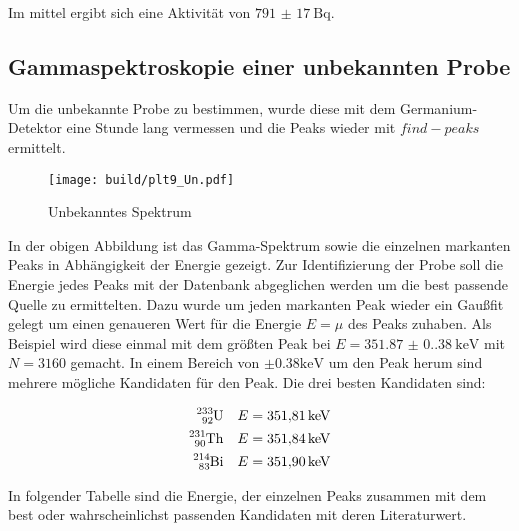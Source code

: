 Im mittel ergibt sich eine Aktivität von $\qty{791(17)}{\becquerel}$.

\subsection{Gammaspektroskopie einer unbekannten Probe}
Um die unbekannte Probe zu bestimmen, wurde diese mit dem Germanium-Detektor
eine Stunde lang vermessen und die Peaks wieder mit $find-peaks$ ermittelt.

\begin{figure}[H]
	\centering
	\texttt{[image: build/plt9\_Un.pdf]}
	\caption{Unbekanntes Spektrum}
	\label{fig:Un_spektrum}
\end{figure}

In der obigen Abbildung ist das Gamma-Spektrum sowie die einzelnen markanten Peaks in
Abhängigkeit der Energie gezeigt. Zur Identifizierung der Probe soll die
Energie jedes Peaks mit der Datenbank \cite{web:nuclear} abgeglichen werden um die
best passende Quelle zu ermittelten. Dazu wurde um jeden markanten Peak wieder ein
Gaußfit gelegt um einen genaueren Wert für die Energie $E=\mu$ des Peaks
zuhaben. Als Beispiel wird diese einmal mit dem größten Peak bei
$E=\qty{351.87(0.38)}{\kilo\eV}$ mit $N=3160$ gemacht. In einem Bereich von
$\pm 0.38\unit{\kilo\eV}$ um den Peak herum sind mehrere mögliche Kandidaten
für den Peak. Die drei besten Kandidaten sind:

\begin{align*}
	\ce{^{233}_{92}U}  &  & E=\qty{351.81}{\kilo\eV} \\
	\ce{^{231}_{90}Th} &  & E=\qty{351.84}{\kilo\eV} \\
	\ce{^{214}_{83}Bi} &  & E=\qty{351.90}{\kilo\eV} \\
\end{align*}

In folgender Tabelle sind die Energie, der einzelnen Peaks zusammen mit dem best
oder wahrscheinlichst passenden Kandidaten mit deren Literaturwert.

